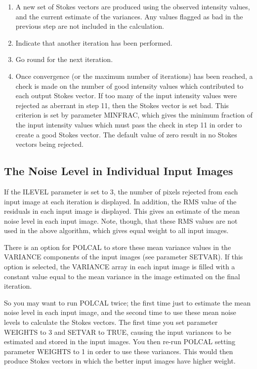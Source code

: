\documentclass[twoside,11pt]{starlink}
\begin{document}
\begin{enumerate}
\item A new set of Stokes vectors are produced using the observed
intensity values, and the current estimate of the variances. Any values
flagged as bad in the previous step are not included in the calculation.

\item Indicate that another iteration has been performed.

\item Go round for the next iteration.

\item Once convergence (or the maximum number of iterations) has been
reached, a check is made on the number of good intensity values which
contributed to each output Stokes vector. If too many of the input
intensity values were rejected as aberrant in step 11, then the Stokes
vector is set bad. This criterion is set by parameter MINFRAC, which
gives the minimum fraction of the input intensity values which must pass
the check in step 11 in order to create a good Stokes vector. The default
value of zero result in no Stokes vectors being rejected.

\end{enumerate}


\subsection{The Noise Level in Individual Input Images}
If the ILEVEL parameter is set to 3, the number of pixels rejected from
each input image at each iteration is displayed. In addition, the RMS
value of the residuals in each input image is displayed. This gives an
estimate of the mean noise level in each input image. Note, though, that
these RMS values are not used in the above algorithm, which gives equal
weight to all input images.

There is an option for POLCAL to store these mean variance values in the
VARIANCE components of the input images (see parameter SETVAR). If this
option is selected, the VARIANCE array in each input image is filled with
a constant value equal to the mean variance in the image estimated on the
final iteration.

So you may want to run POLCAL twice; the first time just to estimate the
mean noise level in each input image, and the second time to use these
mean noise levels to calculate the Stokes vectors. The first time you set
parameter WEIGHTS to 3 and SETVAR to TRUE, causing the input variances to
be estimated and stored in the input images. You then re-run POLCAL
setting parameter WEIGHTS to 1 in order to use these variances. This
would then produce Stokes vectors in which the better input images have
higher weight.
\end{document}
